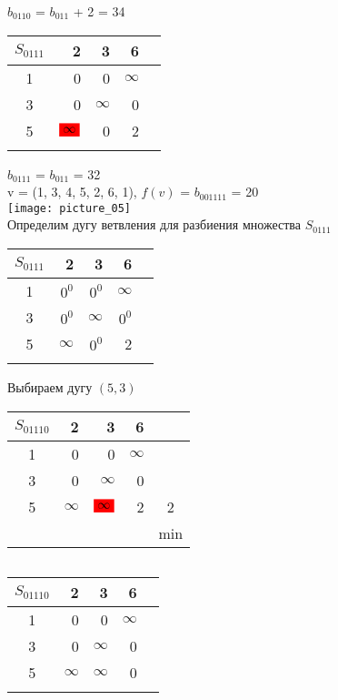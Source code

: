 \documentclass[12pt]{article}
\begin{document}
$b_{0110}$ = $b_{011}$ + 2 = 34\\

\begin{flushleft}
\begin{tabular}{c||rrr||c}
$S_{0111}$  &2 & 3 &  6 & \\
\hline
\hline
1 &  0        & 0           & $\infty$ & \\
3 &  0        & $\infty$    & 0 & \\
5 &  $\colorbox{red}{$\infty$}$        & 0           & 2 & \\
\hline
\hline
 &    &  & &  \\
\end{tabular}
\end{flushleft}
$b_{0111}$ = $b_{011}$ = 32\\

v = (1, 3, 4, 5, 2, 6, 1), $f(v)$ = $b_{001111}$  = 20\\

\texttt{[image: picture\_05]}\\ 



Определим дугу ветвления для разбиения множества $S_{0111}$\\

\begin{flushleft}
\begin{tabular}{c||rrr||c}
$S_{0111}$  &2 & 3 &  6 & \\
\hline
\hline
1 &  $0^0$        & $0^0$           & $\infty$ & \\
3 &  $0^0$        & $\infty$    & $0^0$ & \\
5 &  $\infty$        & $0^0$           & 2 & \\
\hline
\hline
 &  &  & &  \\
\end{tabular}
\end{flushleft}

Выбираем дугу $(5,3)$

\begin{flushleft}
\begin{tabular}{c||rrr||c}
$S_{01110}$  &2 & 3 &  6 & \\
\hline
\hline
1 &  0        & 0           & $\infty$ & \\
3 &  0        & $\infty$    & 0 & \\
5 &  $\infty$        & $\colorbox{red}{$\infty$}$           & 2 & 2\\
\hline
\hline
 &  &  &  & min  \\
\end{tabular}
$\qquad $ 
\begin{tabular}{c||rrr||c}
$S_{01110}$  &2 & 3 &  6 & \\
\hline
\hline
1 &  0        & 0           & $\infty$ & \\
3 &  0        & $\infty$    & 0 & \\
5 &  $\infty$        & $\infty$           & 0 &  \\
\hline
\hline
 &  &  & & \\
\end{tabular}
\end{flushleft}
\end{document}
